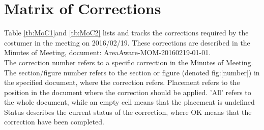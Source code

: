 \chapter{Matrix of Corrections}
\label{chp:matrix}

Table \ref{tb:MoC1}and \ref{tb:MoC2} lists and tracks the corrections required by the costumer in the meeting on 2016/02/19. These corrections are described in the Minutes of Meeting, document: AreaAware-MOM-20160219-01-01.\\

The correction number refers to a specific correction in the Minutes of Meeting. 
The section/figure number refers to the section or figure (denoted fig:[number]) in the specified document, where the correction refers. 
Placement refers to the position in the document where the correction should be applied. 'All' refers to the whole document, while an empty cell means that the placement is undefined
Status describes the current status of the correction, where OK means that the correction have been completed.\\

